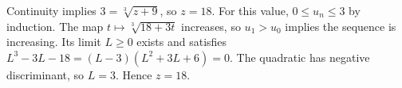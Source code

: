 Continuity implies $3=\sqrt[3]{z+9}$, so $z=18$. For this value, $0\le u_n\le3$ by induction. The map $t\mapsto\sqrt[3]{18+3t}$ increases, so $u_1>u_0$ implies the sequence is increasing. Its limit $L\ge0$ exists and satisfies $L^3-3L-18=(L-3)(L^2+3L+6)=0$. The quadratic has negative discriminant, so $L=3$. Hence $\boxed{z=18}$.
